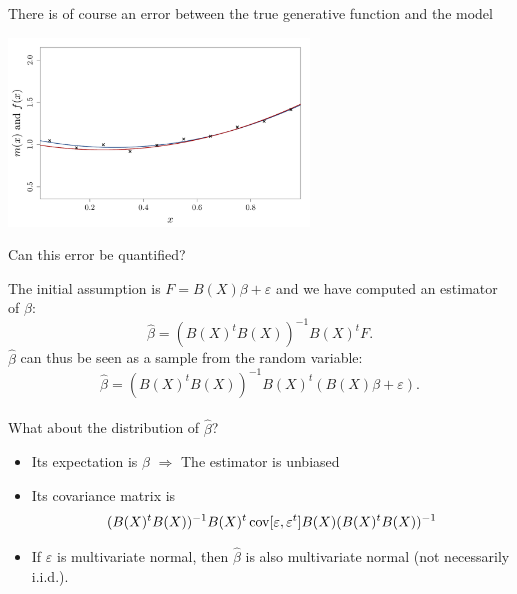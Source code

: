\begin{frame}{}
\begin{example}
There is of course an error between the true generative function and the model
\begin{center}
  \includegraphics[height=5cm]{1_stat_models/figures/R/linreg_3}
\end{center}
Can this error be quantified?
\end{example}
\end{frame}

\begin{frame}{}
The initial assumption is $ F = B(X) \beta  + \varepsilon$ and we have computed an estimator of $\beta$:
$$\hat{\beta} = (B(X)^t B(X))^{-1} B(X)^t F.$$
$\hat{\beta}$ can thus be seen as a sample from the random variable:
$$\hat{\beta} = (B(X)^t B(X))^{-1} B(X)^t (B(X) \beta  + \varepsilon).$$ \\
\vspace{5mm}
What about the distribution of $\hat{\beta}$? \pause
\begin{itemize}
	\item Its expectation is $\beta$ \alert{$\Rightarrow$} The estimator is unbiased
	\item Its covariance matrix is $$(B(X)^t B(X))^{-1} B(X)^t \operatorname*{cov}[\varepsilon,\varepsilon^t] B(X) (B(X)^t B(X))^{-1}$$
	\item If $\varepsilon$ is multivariate normal, then $\hat{\beta}$ is also multivariate normal (not necessarily i.i.d.).
\end{itemize}
\end{frame}

